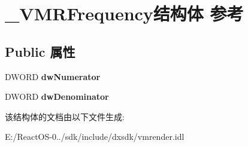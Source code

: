 \hypertarget{struct___v_m_r_frequency}{}\section{\+\_\+\+V\+M\+R\+Frequency结构体 参考}
\label{struct___v_m_r_frequency}
\subsection*{Public 属性}
\begin{DoxyCompactItemize}
\item 
\mbox{\label{struct___v_m_r_frequency_a9c79399eb47a0fc0e0beb8e944b7cd6a}} 
D\+W\+O\+RD {\bfseries dw\+Numerator}
\item 
\mbox{\label{struct___v_m_r_frequency_ad5221552c3257c19b0f68b60a0686124}} 
D\+W\+O\+RD {\bfseries dw\+Denominator}
\end{DoxyCompactItemize}


该结构体的文档由以下文件生成\+:\begin{DoxyCompactItemize}
\item 
E\+:/\+React\+O\+S-\/0../sdk/include/dxsdk/vmrender.\+idl\end{DoxyCompactItemize}
